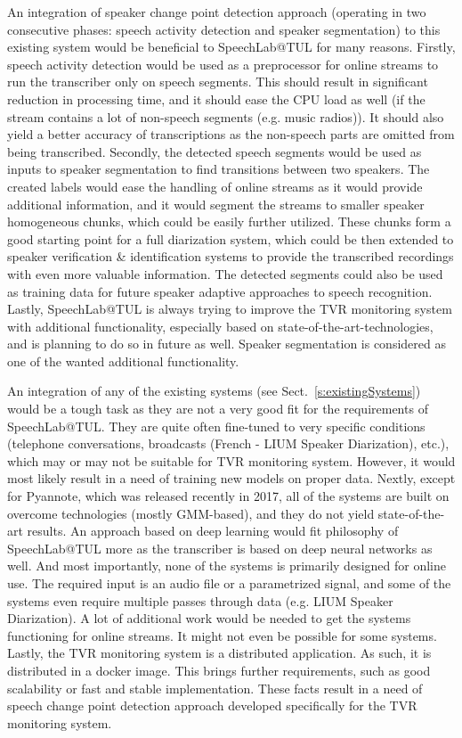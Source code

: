 \documentclass[FM,noheader,EN,bwtitles]{tulthesis}
\begin{document}
An integration of speaker change point detection approach (operating in two consecutive phases: speech activity detection and speaker segmentation) to this existing system would be beneficial to SpeechLab@TUL for many reasons.
Firstly, speech activity detection would be used as a preprocessor for online streams to run the transcriber only on speech segments.
This should result in significant reduction in processing time, and it should ease the CPU load as well (if the stream contains a lot of non-speech segments (e.g. music radios)).
It should also yield a better accuracy of transcriptions as the non-speech parts are omitted from being transcribed.
Secondly, the detected speech segments would be used as inputs to speaker segmentation to find transitions between two speakers.
The created labels would ease the handling of online streams as it would provide additional information, and it would segment the streams to smaller speaker homogeneous chunks, which could be easily further utilized.
These chunks form a good starting point for a full diarization system, which could be then extended to speaker verification \& identification systems to provide the transcribed recordings with even more  valuable information.
The detected segments could also be used as training data for future speaker adaptive approaches to speech recognition.
Lastly, SpeechLab@TUL is always trying to improve the TVR monitoring system with additional functionality, especially based on state-of-the-art-technologies, and is planning to do so in future as well.
Speaker segmentation is considered as one of the wanted additional functionality.

An integration of any of the existing systems (see Sect.~\ref{s:existingSystems}) would be a tough task as they are not a very good fit for the requirements of SpeechLab@TUL.
They are quite often fine-tuned to very specific conditions (telephone conversations, broadcasts (French - LIUM Speaker Diarization), etc.), which may or may not be suitable for TVR monitoring system. However, it would most likely result in a need of training new models on proper data.
Nextly, except for Pyannote, which was released recently in 2017, all of the systems are built on overcome technologies (mostly GMM-based), and they do not yield state-of-the-art results.
An approach based on deep learning would fit philosophy of SpeechLab@TUL more as the transcriber is based on deep neural networks as well.
And most importantly, none of the systems is primarily designed for online use.
The required input is an audio file or a parametrized signal, and some of the systems even require multiple passes through data (e.g. LIUM Speaker Diarization).
A lot of additional work would be needed to get the systems functioning for online streams.
It might not even be possible for some systems.
Lastly, the TVR monitoring system is a distributed application.
As such, it is distributed in a docker image.
This brings further requirements, such as good scalability or fast and stable implementation.
These facts result in a need of speech change point detection approach developed specifically for the TVR monitoring system.
\end{document}
